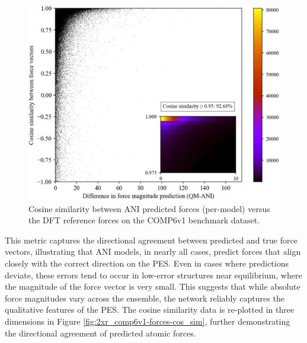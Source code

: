 \begin{figure}[H]
    \centering
    \includegraphics[width=1\linewidth]{Images/2xr_forces/cos_sim-hist2d-insert.png}
    \caption[2D histogram of cosine similarity measure of predicted atomic force vectors]{
    Cosine similarity between ANI predicted forces (per-model) versus the DFT reference forces on the COMP6v1 benchmark dataset.
    }
    \label{fig:2d_2xr_comp6v1-forces-cos_sim}
\end{figure}

This metric captures the directional agreement between predicted and true force vectors, illustrating that ANI models, in nearly all cases, predict forces that align closely with the correct direction on the PES. 
Even in cases where predictions deviate, these errors tend to occur in low-error structures near equilibrium, where the magnitude of the force vector is very small. 
This suggests that while absolute force magnitudes vary across the ensemble, the network reliably captures the qualitative features of the PES.
The cosine similarity data is re-plotted in three dimensions in Figure \ref{fig:2xr_comp6v1-forces-cos_sim}, further demonstrating the directional agreement of predicted atomic forces.

